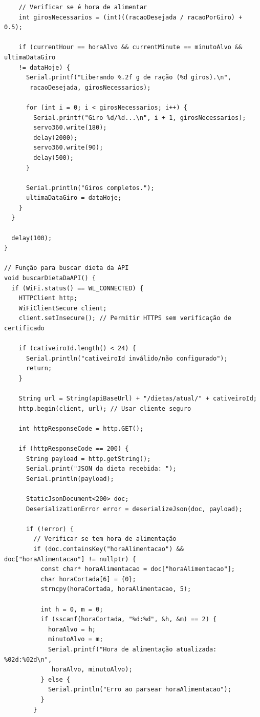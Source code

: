 \documentclass[
  a4paper,
  12pt,
  english,
  brazilian,
]{article}
\begin{document}
\begin{verbatim}
    // Verificar se é hora de alimentar
    int girosNecessarios = (int)((racaoDesejada / racaoPorGiro) + 0.5);
   
    if (currentHour == horaAlvo && currentMinute == minutoAlvo && ultimaDataGiro 
    != dataHoje) {
      Serial.printf("Liberando %.2f g de ração (%d giros).\n",
       racaoDesejada, girosNecessarios);
     
      for (int i = 0; i < girosNecessarios; i++) {
        Serial.printf("Giro %d/%d...\n", i + 1, girosNecessarios);
        servo360.write(180);
        delay(2000);
        servo360.write(90);
        delay(500);
      }
     
      Serial.println("Giros completos.");
      ultimaDataGiro = dataHoje;
    }
  }

  delay(100);
}

// Função para buscar dieta da API
void buscarDietaDaAPI() {
  if (WiFi.status() == WL_CONNECTED) {
    HTTPClient http;
    WiFiClientSecure client;
    client.setInsecure(); // Permitir HTTPS sem verificação de certificado

    if (cativeiroId.length() < 24) {
      Serial.println("cativeiroId inválido/não configurado");
      return;
    }

    String url = String(apiBaseUrl) + "/dietas/atual/" + cativeiroId;
    http.begin(client, url); // Usar cliente seguro

    int httpResponseCode = http.GET();

    if (httpResponseCode == 200) {
      String payload = http.getString();
      Serial.print("JSON da dieta recebida: ");
      Serial.println(payload);

      StaticJsonDocument<200> doc;
      DeserializationError error = deserializeJson(doc, payload);

      if (!error) {
        // Verificar se tem hora de alimentação
        if (doc.containsKey("horaAlimentacao") && doc["horaAlimentacao"] != nullptr) {
          const char* horaAlimentacao = doc["horaAlimentacao"];
          char horaCortada[6] = {0};
          strncpy(horaCortada, horaAlimentacao, 5);

          int h = 0, m = 0;
          if (sscanf(horaCortada, "%d:%d", &h, &m) == 2) {
            horaAlvo = h;
            minutoAlvo = m;
            Serial.printf("Hora de alimentação atualizada: %02d:%02d\n",
             horaAlvo, minutoAlvo);
          } else {
            Serial.println("Erro ao parsear horaAlimentacao");
          }
        }


\end{verbatim}
\end{document}
